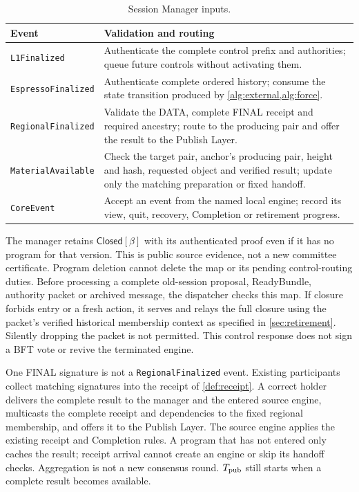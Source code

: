 \documentclass[11pt,a4paper]{article}
\newcommand{\tagg}[1]{\ensuremath{\mathsf{#1}}}
\begin{document}
\begin{table}[htbp]\centering\small
\caption{Session Manager inputs.}
\label{tab:manager-inputs}
\begin{tabularx}{\linewidth}{@{}>{\raggedright\arraybackslash}p{.24\linewidth}Y@{}}\toprule
Event & Validation and routing\\\midrule
\texttt{L1Finalized} & Authenticate the complete control prefix and
authorities; queue future controls without activating them.\\
\texttt{EspressoFinalized} & Authenticate complete ordered history;
consume the state transition produced by \cref{alg:external,alg:force}.\\
\texttt{RegionalFinalized} & Validate the DATA, complete FINAL receipt
and required ancestry; route to the producing pair and offer the result
to the Publish Layer.\\
\texttt{MaterialAvailable} & Check the target pair, anchor's producing
pair, height and hash, requested object and verified result; update only
the matching preparation or fixed handoff.\\
\texttt{CoreEvent} & Accept an event from the named local engine;
record its view, quit, recovery, Completion or retirement progress.\\\bottomrule
\end{tabularx}
\end{table}

The manager retains $\tagg{Closed}[\beta]$ with its authenticated proof
even if it has no program for that version. This is public source evidence,
not a new committee certificate. Program deletion cannot delete the map
or its pending control-routing duties. Before processing a complete
old-session proposal, ReadyBundle, authority packet or archived message,
the dispatcher checks this map. If closure forbids entry or a fresh
action, it serves and relays the full closure using the packet's verified
historical membership context as specified in \cref{sec:retirement}.
Silently dropping the packet is not permitted. This control response
does not sign a BFT vote or revive the terminated engine.

One FINAL signature is not a \texttt{RegionalFinalized} event. Existing
participants collect matching signatures into the receipt of
\cref{def:receipt}. A correct holder delivers the complete result to
the manager and the entered source engine, multicasts the complete
receipt and dependencies to the fixed regional membership, and offers
it to the Publish Layer. The source engine applies the existing receipt and Completion
rules. A program that has not entered only caches the result; receipt
arrival cannot create an engine or skip its handoff checks. Aggregation
is not a new consensus round. $T_{\rm pub}$ still starts when a complete
result becomes available.
\end{document}
